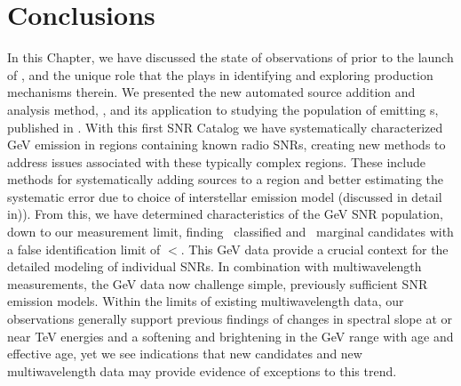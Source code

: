 \section{Conclusions}\label{snrcat:Conclusions}
In this Chapter, we have discussed the state of \gam{} observations of \snrs{} prior to the launch of \Fermi{}, and the unique role that the \lat{} plays in identifying \snrs{} and exploring \gam{} production mechanisms therein. We presented the new automated source addition and analysis method, \srcs{}, and its application to studying the population of \snrs{} emitting\gev{} \gam{}s, published in \cite{snrCat}. With this first \FermiLat{} SNR Catalog we have systematically characterized GeV emission in regions containing known radio SNRs, creating new methods to address issues associated with these typically complex regions. These include methods for systematically adding sources to a region and better estimating the systematic error due to choice of interstellar emission model (discussed in detail in)\cite{snrCat}). From this, we have determined characteristics of the GeV SNR population, down to our measurement limit, finding \nclassifiedsnrs~classified and \nmarginal~marginal candidates with a false identification limit of $< $\nninetyfivemockpercent  \citep{snrCat}. This GeV data provide a crucial context for the detailed modeling of individual SNRs. In combination with multiwavelength measurements, the GeV data now challenge simple, previously sufficient SNR emission models. Within the limits of existing multiwavelength data, our observations generally support previous findings of changes in spectral slope at or near TeV energies and a softening and brightening in the GeV range with age and effective age, yet we see indications that new candidates and new multiwavelength data may provide evidence of exceptions to this trend. %



